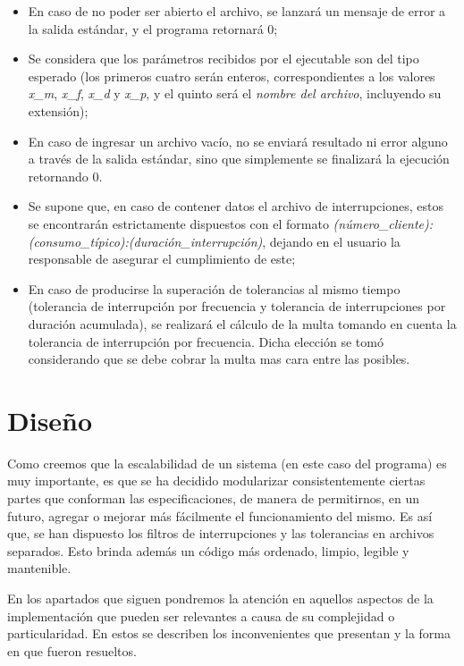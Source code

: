 \documentclass{article}
\begin{document}
\begin{itemize}
	\itemsep=3pt \topsep=0pt \partopsep=0pt \parskip=0pt \parsep=0pt

	\item En caso de no poder ser abierto el archivo, se lanzará un mensaje de error a la salida estándar, y el programa retornará 0;

	\item Se considera que los parámetros recibidos por el ejecutable son del tipo esperado (los primeros cuatro serán enteros, correspondientes a los valores \textit{x\_m}, \textit{x\_f}, \textit{x\_d} y \textit{x\_p}, y el quinto será el \textit{nombre del archivo}, incluyendo su extensión);

	\item En caso de ingresar un archivo vacío, no se enviará resultado ni error alguno a través de la salida estándar, sino que simplemente se finalizará la ejecución retornando 0.

	\item Se supone que, en caso de contener datos el archivo de interrupciones, estos se encontrarán estrictamente dispuestos con el formato \textit{(número\_cliente):(consumo\_típico):(duración\_interrupción)}, dejando en el usuario la responsable de asegurar el cumplimiento de este;

	\item En caso de producirse la superación de tolerancias al mismo tiempo (tolerancia de interrupción por frecuencia y tolerancia de interrupciones por duración acumulada), se realizará el cálculo de la multa tomando en cuenta la tolerancia de interrupción por frecuencia. Dicha elección se tomó considerando que se debe cobrar la multa mas cara entre las posibles.

\end{itemize}
\smallskip




\section{Diseño}

	Como creemos que la escalabilidad de un sistema (en este caso del programa) es muy importante, es que se ha decidido modularizar consistentemente ciertas partes que conforman las especificaciones, de manera de permitirnos, en un futuro, agregar o mejorar más fácilmente el funcionamiento del mismo. Es así que, se han dispuesto los filtros de interrupciones y las tolerancias en archivos separados. Esto brinda además un código más ordenado, limpio, legible y mantenible.
	\par
	En los apartados que siguen pondremos la atención en aquellos aspectos de la implementación que pueden ser relevantes a causa de su complejidad o particularidad. En estos se describen los inconvenientes que presentan y la forma en que fueron resueltos.
\bigskip
\end{document}
